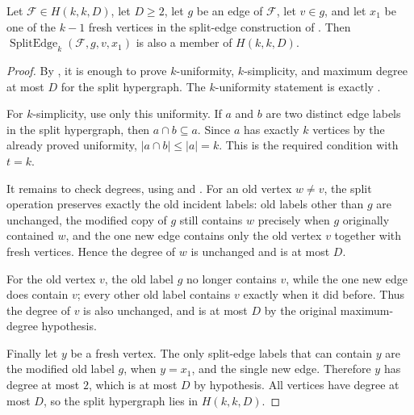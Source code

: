 \begin{helper}
Let $\mathcal F\in H(k,k,D)$, let $D\ge 2$, let $g$ be an edge of
$\mathcal F$, let $v\in g$, and let $x_1$ be one of the $k-1$ fresh
vertices in the split-edge construction of
.  Then
$\operatorname{SplitEdge}_k(\mathcal F,g,v,x_1)$ is also a member of
$H(k,k,D)$.
\end{helper}
\begin{proof}
By , it is enough to prove $k$-uniformity,
$k$-simplicity, and maximum degree at most $D$ for the split hypergraph.
The $k$-uniformity statement is exactly .

For $k$-simplicity, use only this uniformity.  If $a$ and $b$ are two
distinct edge labels in the split hypergraph, then
$a\cap b\subseteq a$.  Since $a$ has exactly $k$ vertices by the already
proved uniformity, $|a\cap b|\le |a|=k$.  This is the required
 condition with $t=k$.

It remains to check degrees, using  and
.  For an old vertex $w\ne v$, the split
operation preserves exactly the old incident labels: old labels other than
$g$ are unchanged, the modified copy of $g$ still contains $w$ precisely
when $g$ originally contained $w$, and the one new edge contains only the
old vertex $v$ together with fresh vertices.  Hence the degree of $w$ is
unchanged and is at most $D$.

For the old vertex $v$, the old label $g$ no longer contains $v$, while the
one new edge does contain $v$; every other old label contains $v$ exactly
when it did before.  Thus the degree of $v$ is also unchanged, and is at
most $D$ by the original maximum-degree hypothesis.

Finally let $y$ be a fresh vertex.  The only split-edge labels that can
contain $y$ are the modified old label $g$, when $y=x_1$, and the single new
edge.  Therefore $y$ has degree at most $2$, which is at most $D$ by
hypothesis.  All vertices have degree at most $D$, so the split hypergraph
lies in $H(k,k,D)$.
\end{proof}
